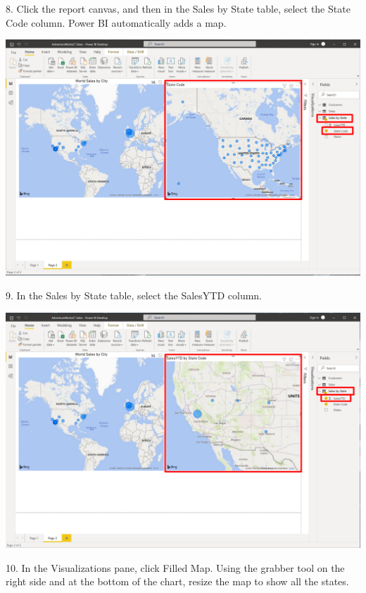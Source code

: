 \documentclass[12pt,letterpaper]{article}
\begin{document}
8. Click the report canvas, and then in the Sales by State table, select the State Code column. Power BI
automatically adds a map.
\begin{center}
    \includegraphics[width=16cm]{img/106.png}
\end{center}
9. In the Sales by State table, select the SalesYTD column.
\begin{center}
    \includegraphics[width=16cm]{img/107.png}
\end{center}
10. In the Visualizations pane, click Filled Map. Using the grabber tool on the right side and at the bottom of
the chart, resize the map to show all the states.
\end{document}
